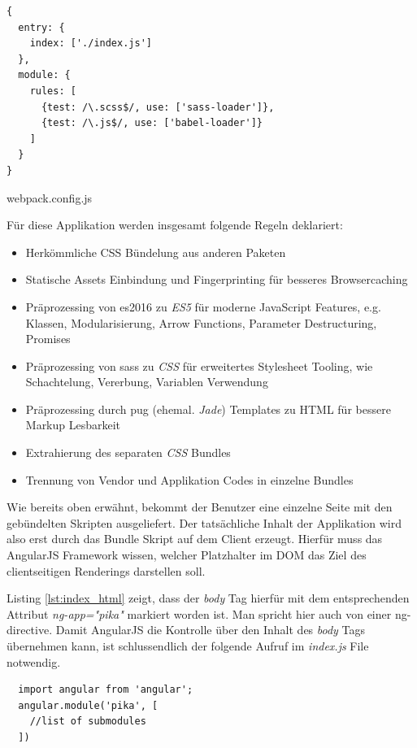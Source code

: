 \begin{listing}[H]
\begin{verbatim}
{
  entry: {
    index: ['./index.js']
  },
  module: {
    rules: [
      {test: /\.scss$/, use: ['sass-loader']},
      {test: /\.js$/, use: ['babel-loader']}
    ]
  }
}
\end{verbatim}
\caption{webpack.config.js}
\label{lst:webpack_config}
\end{listing}

Für diese Applikation werden insgesamt folgende Regeln deklariert:

\begin{itemize}
 \item Herkömmliche CSS Bündelung aus anderen Paketen
 \item Statische Assets Einbindung und Fingerprinting für besseres Browsercaching
 \item Präprozessing von \gls{es2016} zu \textit{ES5} für moderne JavaScript Features, e.g. Klassen, Modularisierung, Arrow Functions, Parameter Destructuring, Promises   
 \item Präprozessing von \gls{sass} zu \textit{CSS} für erweitertes Stylesheet Tooling, wie Schachtelung, Vererbung, Variablen Verwendung
 \item Präprozessing durch \gls{pug} (ehemal. \textit{Jade}) Templates zu HTML für bessere Markup Lesbarkeit
 \item Extrahierung des separaten \textit{CSS} Bundles
 \item Trennung von Vendor und Applikation Codes in einzelne Bundles
\end{itemize}

Wie bereits oben erwähnt, bekommt der Benutzer eine einzelne Seite mit den gebündelten Skripten ausgeliefert. Der tatsächliche Inhalt der Applikation wird also erst durch das Bundle Skript auf dem Client erzeugt. Hierfür muss das AngularJS Framework wissen, welcher Platzhalter im DOM das Ziel des clientseitigen Renderings darstellen soll.  

Listing \ref{lst:index_html} zeigt, dass der \textit{body} Tag hierfür mit dem entsprechenden Attribut \textit{ng-app="pika"} markiert worden ist. Man spricht hier auch von einer \gls{ng-directive}. Damit AngularJS die Kontrolle über den Inhalt des \textit{body} Tags übernehmen kann, ist schlussendlich der folgende Aufruf im \textit{index.js} File notwendig. 

\begin{listing}[H]
\begin{verbatim}
  import angular from 'angular';
  angular.module('pika', [ 
    //list of submodules 
  ])
\end{verbatim}
\end{listing}


